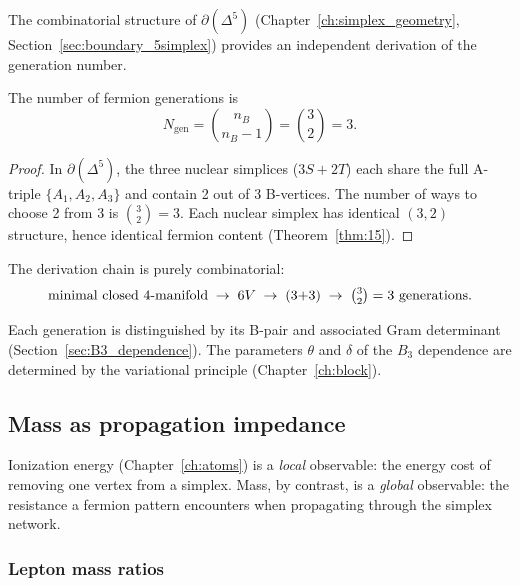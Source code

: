 The combinatorial structure of $\partial(\Delta^5)$ (Chapter~\ref{ch:simplex_geometry}, Section~\ref{sec:boundary_5simplex}) provides an independent derivation of the generation number.

\begin{theorem}
\label{thm:gen_count}
The number of fermion generations is
\begin{equation}
N_\mathrm{gen} = \binom{n_B}{n_B - 1} = \binom{3}{2} = 3.
\end{equation}
\end{theorem}

\begin{proof}
In $\partial(\Delta^5)$, the three nuclear simplices ($3S + 2T$) each share the full A-triple $\{A_1, A_2, A_3\}$ and contain 2 out of 3 B-vertices. The number of ways to choose 2 from 3 is $\binom{3}{2} = 3$.  Each nuclear simplex has identical $(3,2)$ structure, hence identical fermion content (Theorem~\ref{thm:15}).
\end{proof}

The derivation chain is purely combinatorial:
\begin{equation}
\text{minimal closed $4$-manifold} \;\to\; 6V \;\to\; (3{+}3) \;\to\; \tbinom{3}{2} = 3 \text{ generations}.
\end{equation}

Each generation is distinguished by its B-pair and associated Gram determinant (Section~\ref{sec:B3_dependence}).  The parameters $\theta$ and $\delta$ of the $B_3$ dependence are determined by the variational principle (Chapter~\ref{ch:block}).

\subsection{Mass as propagation impedance}
\label{sec:mass_impedance}

Ionization energy (Chapter~\ref{ch:atoms}) is a \emph{local} observable: the energy cost of removing one vertex from a simplex.  Mass, by contrast, is a \emph{global} observable: the resistance a fermion pattern encounters when propagating through the simplex network.

\subsubsection{Lepton mass ratios}

